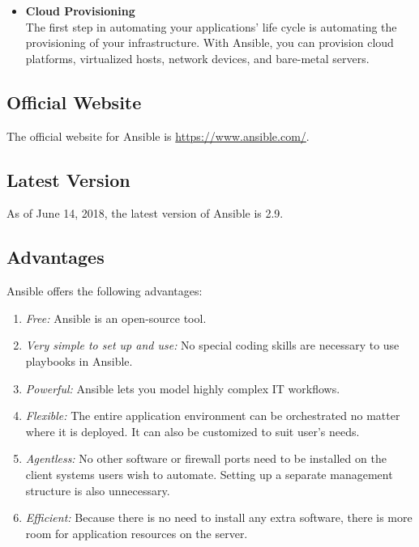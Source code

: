 \documentclass[a4paper, 12pt]{article}
\begin{document}
\begin{itemize}
\item
\textbf{Cloud Provisioning}\\
The first step in automating your applications' life cycle is automating the provisioning of your infrastructure. With Ansible, you can provision cloud platforms, virtualized hosts, network devices, and bare-metal servers.
\end{itemize}

\subsection{Official Website}
The official website for Ansible is \href{https://www.ansible.com/}{https://www.ansible.com/}.

\subsection{Latest Version}
As of June 14, 2018, the latest version of Ansible is 2.9.

\subsection{Advantages}
Ansible offers the following advantages:
\begin{enumerate}
\item
\textit{Free:} Ansible is an open-source tool.
\item
\textit{Very simple to set up and use:} No special coding skills are necessary to use playbooks in Ansible.
\item
\textit{Powerful:} Ansible lets you model highly complex IT workflows.
\item
\textit{Flexible:} The entire application environment can be orchestrated no matter where it is deployed. It can also be customized to suit user's needs.
\item
\textit{Agentless:} No other software or firewall ports need to be installed on the client systems users wish to automate. Setting up a separate management structure is also unnecessary. 
\item
\textit{Efficient:} Because there is no need to install any extra software, there is more room for application resources on the server.
\end{enumerate}
\end{document}
